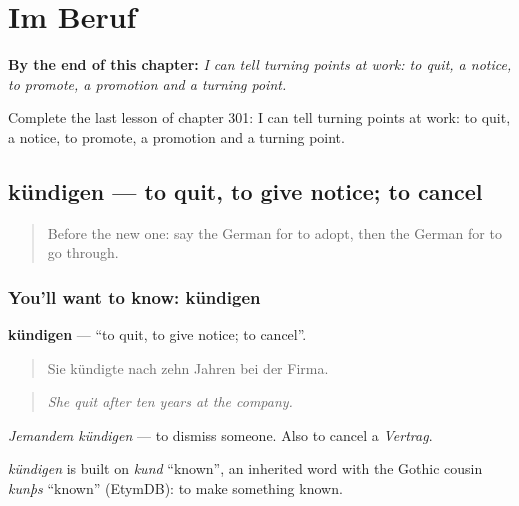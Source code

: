 
\chapter{Im Beruf}
\label{ch:ge-im-beruf}

\begin{chapteropening}
\textbf{By the end of this chapter:} \emph{I can tell turning points at work: to quit, a notice, to promote, a promotion and a turning point.}

Complete the last lesson of chapter 301: I can tell turning points at work: to quit, a notice, to promote, a promotion and a turning point.
\end{chapteropening}

\section[kündigen]{kündigen — to quit, to give notice; to cancel}

\label{lesson:GE-C301-kuendigen}



\begin{quote}
Before the new one: say the German for to adopt, then the German for to go through.
\end{quote}

\subsection*{You'll want to know: kündigen}
\textbf{kündigen} — \textquotedblleft{}to quit, to give notice; to cancel\textquotedblright{}.

\begin{quote}
Sie kündigte nach zehn Jahren bei der Firma.
\end{quote}

\begin{quote}
\emph{She quit after ten years at the company.}
\end{quote}

\emph{Jemandem kündigen} — to dismiss someone. Also to cancel a \emph{Vertrag}.

\begin{cousinweb}
\emph{kündigen} is built on \emph{kund} \textquotedblleft{}known\textquotedblright{}, an inherited word with the Gothic cousin \emph{kunþs} \textquotedblleft{}known\textquotedblright{} (EtymDB): to make something known.
\end{cousinweb}

